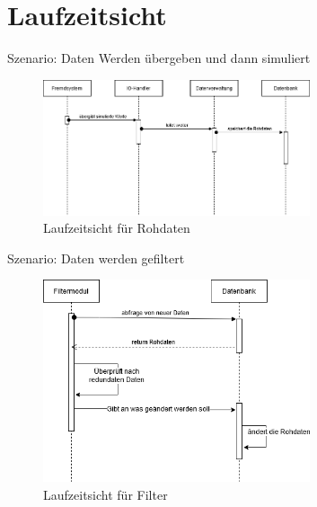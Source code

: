 \chapter{Laufzeitsicht}
\label{ch:Laufzeitsicht}

Szenario: Daten Werden übergeben und dann simuliert
\begin{figure}[tbh]
    \centering
    \includegraphics[width=0.7\textwidth]{Graphics/Laufzeit_Rohdaten.png}
    \caption{Laufzeitsicht für Rohdaten}
    \label{fig:LaufzeitRohdaten}
  \end{figure}

  Szenario: Daten werden gefiltert
\begin{figure}[tbh]
    \centering
    \includegraphics[width=0.7\textwidth]{Graphics/Laufzeit_Filter.png}
    \caption{Laufzeitsicht für Filter}
    \label{fig:LaufzeitFilter}
  \end{figure}